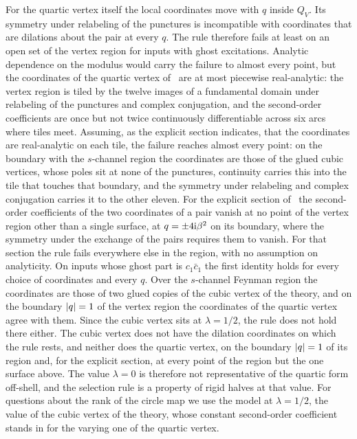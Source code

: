 For the quartic vertex itself the local coordinates move with $q$ inside $Q_V$.
Its symmetry under relabeling of the punctures is incompatible with coordinates that are dilations about the pair at every $q$.
The rule therefore fails at least on an open set of the vertex region for inputs with ghost excitations.
Analytic dependence on the modulus would carry the failure to almost every point, but the coordinates of the quartic vertex of~\cite{Erbin:2026:SL2CVerticesClosed} are at most piecewise real-analytic: the vertex region is tiled by the twelve images of a fundamental domain under relabeling of the punctures and complex conjugation, and the second-order coefficients are once but not twice continuously differentiable across six arcs where tiles meet.
Assuming, as the explicit section indicates, that the coordinates are real-analytic on each tile, the failure reaches almost every point: on the boundary with the $s$-channel region the coordinates are those of the glued cubic vertices, whose poles sit at none of the punctures, continuity carries this into the tile that touches that boundary, and the symmetry under relabeling and complex conjugation carries it to the other eleven.
For the explicit section of~\cite{Erbin:2026:SL2CVerticesClosed} the second-order coefficients of the two coordinates of a pair vanish at no point of the vertex region other than a single surface, at $q = \pm 4 \mathrm{i} \beta^2$ on its boundary, where the symmetry under the exchange of the pairs requires them to vanish.
For that section the rule fails everywhere else in the region, with no assumption on analyticity.
On inputs whose ghost part is $c_1 \bar c_1$ the first identity holds for every choice of coordinates and every $q$.
Over the $s$-channel Feynman region the coordinates are those of two glued copies of the cubic vertex of the theory, and on the boundary ${|q|} = 1$ of the vertex region the coordinates of the quartic vertex agree with them.
Since the cubic vertex sits at $\lambda = 1 / 2$, the rule does not hold there either.
The cubic vertex does not have the dilation coordinates on which the rule rests, and neither does the quartic vertex, on the boundary ${|q|} = 1$ of its region and, for the explicit section, at every point of the region but the one surface above.
The value $\lambda = 0$ is therefore not representative of the quartic form off-shell, and the selection rule is a property of rigid halves at that value.
For questions about the rank of the circle map we use the model at $\lambda = 1 / 2$, the value of the cubic vertex of the theory, whose constant second-order coefficient stands in for the varying one of the quartic vertex.
